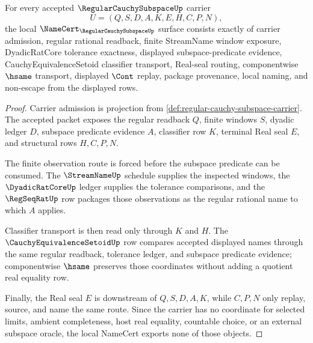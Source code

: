 \begin{theorem}
\label{thm:regular-cauchy-subspace-namecert-obligations}
For every accepted $\RegularCauchySubspaceUp$ carrier
$$
U=(Q,S,D,A,K,E,H,C,P,N),
$$
the local $\NameCert_{\RegularCauchySubspaceUp}$ surface consists exactly of carrier admission, regular rational readback, finite StreamName window exposure, DyadicRatCore tolerance exactness, displayed subspace-predicate evidence, CauchyEquivalenceSetoid classifier transport, Real-seal routing, componentwise $\hsame$ transport, displayed $\Cont$ replay, package provenance, local naming, and non-escape from the displayed rows.
\end{theorem}
\begin{proof}
Carrier admission is projection from \autoref{def:regular-cauchy-subspace-carrier}. The accepted packet exposes the regular readback $Q$, finite windows $S$, dyadic ledger $D$, subspace predicate evidence $A$, classifier row $K$, terminal Real seal $E$, and structural rows $H,C,P,N$.

The finite observation route is forced before the subspace predicate can be consumed. The $\StreamNameUp$ schedule supplies the inspected windows, the $\DyadicRatCoreUp$ ledger supplies the tolerance comparisons, and the $\RegSeqRatUp$ row packages those observations as the regular rational name to which $A$ applies.

Classifier transport is then read only through $K$ and $H$. The $\CauchyEquivalenceSetoidUp$ row compares accepted displayed names through the same regular readback, tolerance ledger, and subspace predicate evidence; componentwise $\hsame$ preserves those coordinates without adding a quotient real equality row.

Finally, the Real seal $E$ is downstream of $Q,S,D,A,K$, while $C,P,N$ only replay, source, and name the same route. Since the carrier has no coordinate for selected limits, ambient completeness, host real equality, countable choice, or an external subspace oracle, the local NameCert exports none of those objects.
\end{proof}

